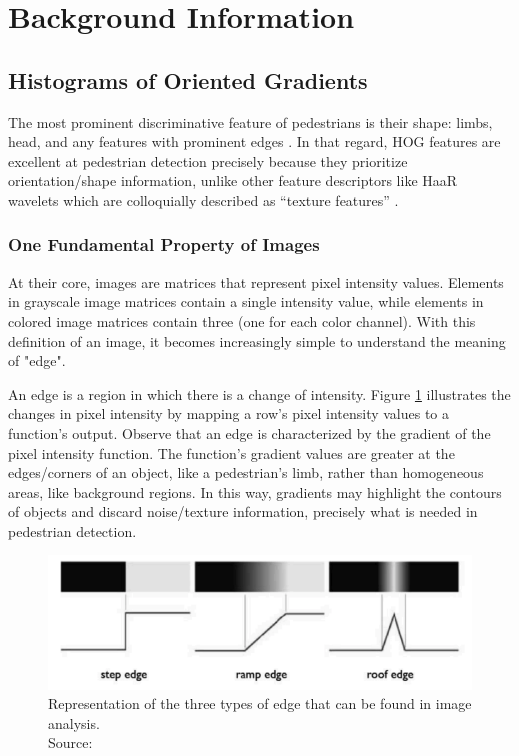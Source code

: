 \section{Background Information}
\subsection{Histograms of Oriented Gradients}\label{sec:hog}
The most prominent discriminative feature of pedestrians is their shape: limbs, head, and any features with prominent edges \cite{dalal_2005_histograms}. In that regard, HOG features are excellent at pedestrian detection precisely because they prioritize orientation/shape information, unlike other feature descriptors like HaaR wavelets which are colloquially described as “texture features” 
\cite{zia_2015_why}. 
\subsubsection{One Fundamental Property of Images}
At their core, images are matrices that represent pixel intensity values. 
Elements in grayscale image matrices contain a single intensity value, while elements in colored image matrices contain three (one for each color channel). With this definition of an image, it becomes increasingly simple to understand the meaning of "edge".

An edge is a region in which there is a change of intensity. Figure \ref{fig:pixel_intensity} illustrates the changes in pixel intensity by mapping a row's pixel intensity values to a function's output. Observe that an edge is characterized by the gradient of the pixel intensity function. The function's gradient values are greater at the edges/corners of an object, like a pedestrian's limb, rather than homogeneous areas, like background regions. In this way, gradients may highlight the contours of objects and discard noise/texture information, precisely what is needed in pedestrian detection.

\begin{figure}
    \centering
    \includegraphics[width=0.75\linewidth]{images/pixel_intensity.png}
    \caption{Representation of the three types of edge that can be found in image analysis.\\Source: \cite{niebles2012edge}}
    \label{fig:pixel_intensity}
\end{figure}

